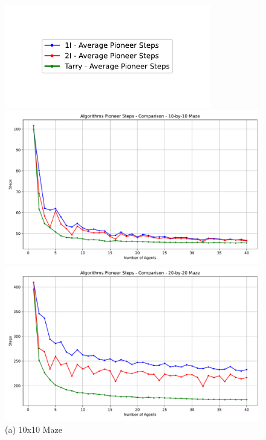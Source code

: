 \begin{figure}[H]
    \centering
    \includegraphics[width=0.8\textwidth]{Cap3/no_comm_steps_legend.pdf}
    \vspace{1em}
    \begin{minipage}[b]{0.45\textwidth}
        \centering
        \includegraphics[width=\textwidth]{Cap3/no_comm_steps__10_by_10_maze.pdf}
        \caption{(a) 10x10 Maze}
        \label{fig_no_comm_steps_10x10_maze}
    \end{minipage}
    \hfill
    \begin{minipage}[b]{0.45\textwidth}
        \centering
        \includegraphics[width=\textwidth]{Cap3/no_comm_steps__20_by_20_maze.pdf}

\end{minipage}
\end{figure}
